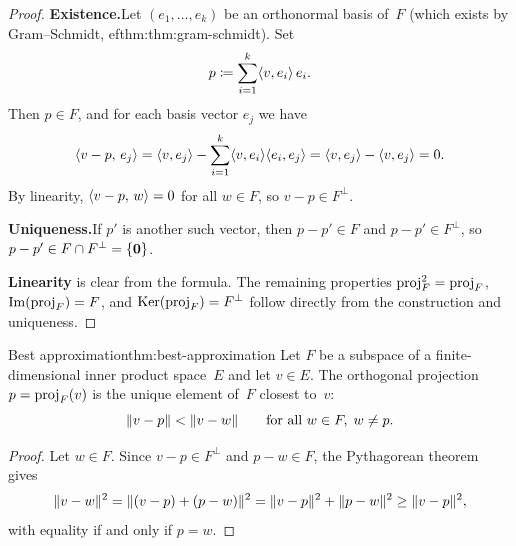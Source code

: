 \begin{proof}
\textbf{Existence.}\quad Let $(e_1,\ldots,e_k)$ be an orthonormal basis
of~$F$ (which exists by Gram--Schmidt, 
ef{thm:thm:gram-schmidt}).  Set
\[
  p \coloneqq \sum_{i=1}^k \langle v,e_i\rangle\, e_i.
\]
Then $p\in F$, and for each basis vector $e_j$ we have
\[
  \langle v - p,\, e_j\rangle
    = \langle v,e_j\rangle - \sum_{i=1}^k \langle v,e_i\rangle\langle e_i,e_j\rangle
    = \langle v,e_j\rangle - \langle v,e_j\rangle = 0.
\]
By linearity, $\langle v-p,\,w\rangle = 0$ for all $w\in F$, so
$v-p\in F^{\perp}$.

\textbf{Uniqueness.}\quad If $p'$ is another such vector, then
$p - p'\in F$ and $p - p'\in F^{\perp}$, so
$p-p'\in F\cap F^{\perp} = \left\{\mathbf{0}\right\}$.

\textbf{Linearity} is clear from the formula.  The remaining properties
$\operatorname{proj}_F^2 = \operatorname{proj}_F$, $\operatorname{Im}(\operatorname{proj}_F) = F$, and
$\operatorname{Ker}(\operatorname{proj}_F) = F^{\perp}$ follow directly from the construction and
uniqueness.
\end{proof}

\begin{theorem}{Best approximation}{thm:best-approximation}
Let $F$ be a subspace of a finite-dimensional inner product space~$E$
and let $v\in E$.  The orthogonal projection $p = \operatorname{proj}_F(v)$ is the
unique element of~$F$ closest to~$v$:
\[
  \lVert v - p\rVert < \lVert v - w\rVert
  \qquad\text{for all } w\in F,\; w\neq p.
\]
\end{theorem}

\begin{proof}
Let $w\in F$.  Since $v - p\in F^{\perp}$ and $p - w\in F$, the
Pythagorean theorem gives
\[
  \lVert v - w\rVert^2
    = \lVert(v - p) + (p - w)\rVert^2
    = \lVert v - p\rVert^2 + \lVert p - w\rVert^2
    \geq \lVert v - p\rVert^2,
\]
with equality if and only if $p = w$.
\end{proof}

